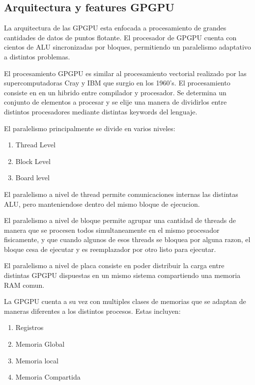 \subsection{Arquitectura y features GPGPU}

La arquitectura de las GPGPU esta enfocada a procesamiento de grandes cantidades de datos
de puntos flotante. El procesador de GPGPU cuenta con cientos de ALU sincronizadas
por bloques, permitiendo un paralelismo adaptativo a distintos problemas.

El procesamiento GPGPU es similar al procesamiento vectorial 
realizado por las supercomputadoras Cray y IBM que surgio en los 1960's.
El procesamiento consiste en en un hibrido entre compilador y procesador. Se determina
un conjunto de elementos a procesar y se elije una manera de dividirlos entre distintos
procesadores mediante distintas keywords del lenguaje. 

El paralelismo principalmente se divide en varios niveles:
\begin{enumerate}
  \item Thread Level
  \item Block Level
  \item Board level
\end{enumerate}

El paralelismo a nivel de thread permite comunicaciones internas las distintas ALU, pero
manteniendose dentro del mismo bloque de ejecucion.

El paralelismo a nivel de bloque permite agrupar una cantidad de threads de manera
que se procesen todos simultaneamente en el mismo procesador fisicamente, y que
cuando algunos de esos threads se bloquea por alguna razon, el bloque cesa de ejecutar
y es reemplazador por otro listo para ejecutar.

El paralelismo a nivel de placa consiste en poder distribuir la carga entre distintas
GPGPU dispuestas en un mismo sistema compartiendo una memoria RAM comun. 

La GPGPU cuenta a su vez con multiples clases de memorias que se adaptan de maneras
diferentes a los distintos procesos. Estas incluyen:

\begin{enumerate}
  \item Registros
  \item Memoria Global
  \item Memoria local
  \item Memoria Compartida
\end{enumerate}

